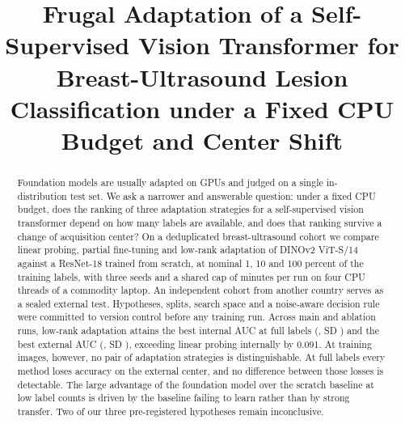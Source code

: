 \documentclass[conference,a4paper]{IEEEtran}
\begin{document}
\title{Frugal Adaptation of a Self-Supervised Vision Transformer for
Breast-Ultrasound Lesion Classification under a Fixed CPU Budget and
Center Shift}

\author{
\and
{}
\and
{}
}

\maketitle

\begin{abstract}
Foundation models are usually adapted on GPUs and judged on a single
in-distribution test set. We ask a narrower and answerable question: under a
fixed CPU budget, does the ranking of three adaptation strategies for a
self-supervised vision transformer depend on how many labels are available, and
does that ranking survive a change of acquisition center? On a deduplicated
breast-ultrasound cohort we compare linear probing, partial fine-tuning and
low-rank adaptation of DINOv2 ViT-S/14 against a ResNet-18 trained from scratch,
at nominal 1, 10 and 100 percent of the training labels, with three seeds and a
shared cap of \valProtocolCapMinutes minutes per run on four CPU threads of a
commodity laptop. An independent cohort from another country serves as a sealed
external test. Hypotheses, splits, search space and a noise-aware decision rule
were committed to version control before any training run. Across \valRunsMain
main and \valRunsAblation ablation runs, low-rank adaptation attains the best
internal AUC at full labels (\valMainLoRAHundredAucInMean, SD
\valMainLoRAHundredAucInSd) and the best external AUC
(\valMainLoRAHundredAucOutMean, SD \valMainLoRAHundredAucOutSd), exceeding
linear probing internally by 0.091. At \valDataSubsetOneN training images,
however, no pair of adaptation strategies is distinguishable. At full labels
every method loses accuracy on the external center, and no difference between
those losses is detectable. The large advantage of the foundation model over the scratch
baseline at low label counts is driven by the baseline failing to learn rather
than by strong transfer. Two of our three pre-registered hypotheses remain
inconclusive.
\end{abstract}
\end{document}
